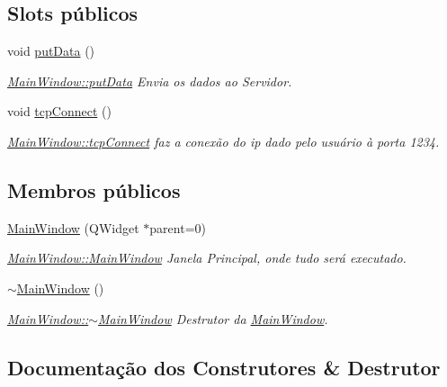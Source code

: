 \subsection*{Slots públicos}
\begin{DoxyCompactItemize}
\item 
void \hyperlink{classMainWindow_afdfeb13ec363b0eb8ecacaf0aa13b605}{put\+Data} ()
\begin{DoxyCompactList}\small\item\em \hyperlink{classMainWindow_afdfeb13ec363b0eb8ecacaf0aa13b605}{Main\+Window\+::put\+Data} Envia os dados ao Servidor. \end{DoxyCompactList}\item 
void \hyperlink{classMainWindow_ac5b669957c442b6eb68573dacfce33e1}{tcp\+Connect} ()
\begin{DoxyCompactList}\small\item\em \hyperlink{classMainWindow_ac5b669957c442b6eb68573dacfce33e1}{Main\+Window\+::tcp\+Connect} faz a conexão do ip dado pelo usuário à porta \textquotesingle{}1234\textquotesingle{}. \end{DoxyCompactList}\end{DoxyCompactItemize}
\subsection*{Membros públicos}
\begin{DoxyCompactItemize}
\item 
\hyperlink{classMainWindow_a8b244be8b7b7db1b08de2a2acb9409db}{Main\+Window} (Q\+Widget $\ast$parent=0)
\begin{DoxyCompactList}\small\item\em \hyperlink{classMainWindow_a8b244be8b7b7db1b08de2a2acb9409db}{Main\+Window\+::\+Main\+Window} Janela Principal, onde tudo será executado. \end{DoxyCompactList}\item 
\hyperlink{classMainWindow_ae98d00a93bc118200eeef9f9bba1dba7}{$\sim$\+Main\+Window} ()
\begin{DoxyCompactList}\small\item\em \hyperlink{classMainWindow_ae98d00a93bc118200eeef9f9bba1dba7}{Main\+Window\+::$\sim$\+Main\+Window} Destrutor da \hyperlink{classMainWindow}{Main\+Window}. \end{DoxyCompactList}\end{DoxyCompactItemize}


\subsection{Documentação dos Construtores \& Destrutor}
\mbox{\label{classMainWindow_a8b244be8b7b7db1b08de2a2acb9409db}} 
